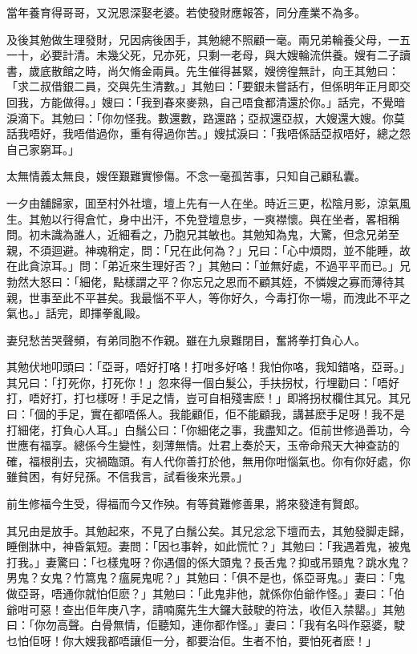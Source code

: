\documentclass[a5paper, 12pt, openany]{book} %
\begin{document}
	當年養育得哥哥，又況恩深娶老婆。若使發財應報答，同分產業不為多。

	及後其勉做生理發財，兄因病後困手，其勉總不照顧一毫。兩兄弟輪養父母，一五一十，必要計清。未幾父死，兄亦死，只剩一老母，與大嫂輪流供養。嫂有二子讀書，歲底散館之時，尚欠脩金兩員。先生催得甚緊，嫂徬徨無計，向王其勉曰：「求二叔借銀二員，交與先生清數。」其勉曰：「要銀未嘗話冇，但係明年正月即交回我，方能做得。」嫂曰：「我到春來麥熟，自己唔食都清還於你。」話完，不覺暗淚滴下。其勉曰：「你勿怪我。數還數，路還路；亞叔還亞叔，大嫂還大嫂。你莫話我唔好，我唔借過你，重有得過你苦。」嫂拭淚曰：「我唔係話亞叔唔好，總之怨自己家窮耳。」

	太無情義太無良，嫂侄艱難實慘傷。不念一毫孤苦事，只知自己顧私囊。

	一夕由舖歸家，囬至村外社壇，壇上先有一人在坐。時近三更，松陰月影，涼氣風生。其勉以行得倉忙，身中出汗，不免登壇息步，一爽襟懷。與在坐者，畧相稱問。初未識為誰人，近細看之，乃胞兄其敏也。其勉知為鬼，大驚，但念兄弟至親，不須迴避。神魂稍定，問：「兄在此何為？」兄曰：「心中煩悶，並不能睡，故在此貪涼耳。」問：「弟近來生理好否？」其勉曰：「並無好處，不過平平而已。」兄勃然大怒曰：「細佬，點樣謂之平？你忘兄之恩而不顧其姪，不憐嫂之寡而薄待其親，世事至此不平甚矣。我最惱不平人，等你好久，今毒打你一場，而洩此不平之氣也。」話完，即揮拳亂毆。

	妻兒愁苦哭聲頻，有弟同胞不作親。雖在九泉難閉目，奮將拳打負心人。

	其勉伏地叩頭曰：「亞哥，唔好打咯！打咁多好咯！我怕你咯，我知錯咯，亞哥。」其兄曰：「打死你，打死你！」忽來得一個白髮公，手扶拐杖，行埋勸曰：「唔好打，唔好打，打乜樣呀！手足之情，豈可自相殘害麽！」即將拐杖欄住其兄。其兄曰：「個的手足，實在都唔係人。我能顧佢，佢不能顧我，講甚麽手足呀！我不是打細佬，打負心人耳。」白鬚公曰：「你細佬之事，我盡知之。佢前世修過善功，今世應有福享。總係今生變性，刻薄無情。灶君上奏於天，玉帝命飛天大神查訪的確，福根削去，灾禍臨頭。有人代你善打於他，無用你咁惱氣也。你有你好處，你雖貧困，有好兒孫。不信我言，試看後來光景。」

	前生修福今生受，得福而今又作殃。有等貧難修善果，將來發達有賢郎。

	其兄由是放手。其勉起來，不見了白鬚公矣。其兄忿忿下壇而去，其勉發脚走歸，睡倒牀中，神昏氣短。妻問：「因乜事幹，如此慌忙？」其勉曰：「我遇着鬼，被鬼打我。」妻驚曰：「乜樣鬼呀？你遇個的係大頭鬼？長舌鬼？抑或吊頸鬼？跳水鬼？男鬼？女鬼？竹篙鬼？瘟屍鬼呢？」其勉曰：「俱不是也，係亞哥鬼。」妻曰：「鬼做亞哥，唔通你就怕佢麽？」其勉曰：「此鬼非他，就係你伯爺作怪。」妻曰：「伯爺咁可惡！查出佢年庚八字，請喃魔先生大鑼大鼓駛的符法，收佢入禁罌。」其勉曰：「你勿高聲。白骨無情，佢聽知，連你都作怪。」妻曰：「我有名呌作惡婆，駛乜怕佢呀！你大嫂我都唔讓佢一分，都要治佢。生者不怕，要怕死者麽！」
\end{document}
